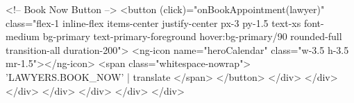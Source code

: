               <!-- Book Now Button -->
              <button (click)="onBookAppointment(lawyer)"
                      class="flex-1 inline-flex items-center justify-center px-3 py-1.5 text-xs font-medium
                             bg-primary text-primary-foreground hover:bg-primary/90
                             rounded-full transition-all duration-200">
                <ng-icon name="heroCalendar" class="w-3.5 h-3.5 mr-1.5"></ng-icon>
                <span class="whitespace-nowrap">{{ 'LAWYERS.BOOK_NOW' | translate }}</span>
              </button>
            </div>
          </div>
        </div>
      </div>
    </div>
  </div>
</div>
